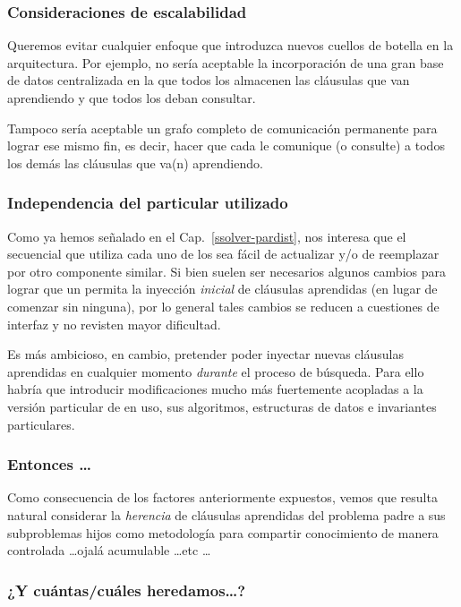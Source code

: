 \subsubsection{Consideraciones de escalabilidad}

Queremos evitar cualquier enfoque que introduzca nuevos cuellos de botella en
la arquitectura. Por ejemplo, no sería aceptable la incorporación de una gran
base de datos centralizada en la que todos los \ws almacenen las cláusulas que
van aprendiendo y que todos los \ws deban consultar.

Tampoco sería aceptable un grafo completo de comunicación permanente para
lograr ese mismo fin, es decir, hacer que cada \w le comunique (o consulte) a
todos los demás las cláusulas que va(n) aprendiendo.


\subsubsection{Independencia del \ssolver particular utilizado}

Como ya hemos señalado en el Cap.~\ref{ssolver-pardist}, nos interesa que el \ssolver
secuencial que utiliza cada uno de los \ws sea fácil de actualizar y/o de
reemplazar por otro componente \ots similar. Si bien suelen ser necesarios
algunos cambios para lograr que un \ssolver permita la inyección
\emph{inicial} de cláusulas aprendidas (en lugar de comenzar sin ninguna), por
lo general tales cambios se reducen a cuestiones de interfaz y no revisten
mayor dificultad.

Es más ambicioso, en cambio, pretender poder inyectar nuevas cláusulas
aprendidas en cualquier momento \emph{durante} el proceso de búsqueda. Para
ello habría que introducir modificaciones mucho más fuertemente acopladas a la
versión particular de \ssolver en uso, sus algoritmos, estructuras de datos e
invariantes particulares.


\subsubsection{Entonces \ldots}

Como consecuencia de los factores anteriormente expuestos, vemos que resulta
natural considerar la \emph{herencia} de cláusulas aprendidas del problema
padre a sus subproblemas hijos como metodología para compartir conocimiento de
manera controlada \ldots ojalá acumulable \ldots etc \ldots


\subsubsection{¿Y cuántas/cuáles heredamos\ldots?}

